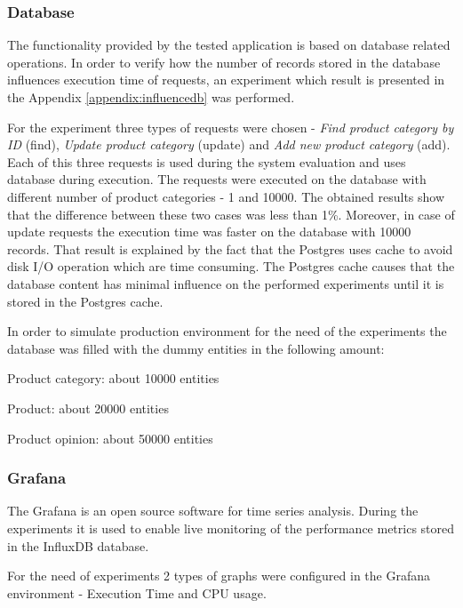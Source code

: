 \documentclass[12pt,a4paper]{article}
\let\tempone\itemize
\let\temptwo\enditemize
\renewenvironment{itemize}{\tempone\addtolength{\itemsep}{-0.4\baselineskip}}{\temptwo}
\begin{document}
\subsubsection{Database}

The functionality provided by the tested application is based on database related operations. In order to verify how the number of records stored in the database influences execution time of requests, an experiment which result is presented in the Appendix \ref{appendix:influencedb} was performed. 

For the experiment three types of requests were chosen - \textit{Find product category by ID} (find), \textit{Update product category} (update) and \textit{Add new product category} (add). Each of this three requests is used during the system evaluation and uses database during execution. The requests were executed on the database with different number of product categories - 1 and 10000. The obtained results show that the difference between these two cases was less than 1\%. Moreover, in case of update requests the execution time was faster on the database with 10000 records. That result is explained by the fact that the Postgres uses cache to avoid disk I/O operation which are time consuming. The Postgres cache causes that the database content has minimal influence on the performed experiments until it is stored in the Postgres cache. 

In order to simulate production environment for the need of the experiments the database was filled with the dummy entities in the following amount: 

\begin{itemize}
\item Product category: about 10000 entities
\item Product: about 20000 entities
\item Product opinion: about 50000 entities
\end{itemize}

\subsubsection{Grafana}

The Grafana is an open source software for time series analysis. During the experiments it is used to enable live monitoring of the performance metrics stored in the InfluxDB database. 

For the need of experiments 2 types of graphs were configured in the Grafana environment - Execution Time and CPU usage. 
\end{document}
